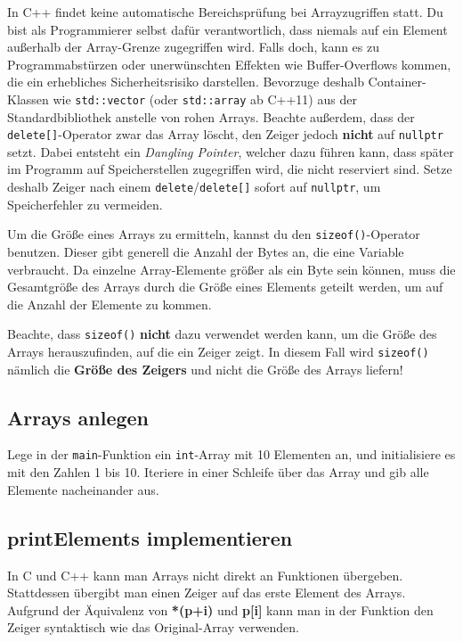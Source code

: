 In C++ findet keine automatische Bereichsprüfung bei Arrayzugriffen statt.
Du bist als Programmierer selbst dafür verantwortlich, dass niemals auf ein Element außerhalb der Array-Grenze zugegriffen wird.
Falls doch, kann es zu Programmabstürzen oder unerwünschten Effekten wie Buffer-Overflows kommen, die ein erhebliches Sicherheitsrisiko darstellen.
Bevorzuge deshalb Container-Klassen wie \lstinline{std::vector} (oder \lstinline{std::array} ab C++11) aus der Standardbibliothek anstelle von \glqq rohen\grqq{} Arrays.
Beachte außerdem, dass der \lstinline{delete[]}-Operator zwar das Array löscht, den Zeiger jedoch \textbf{nicht} auf \lstinline{nullptr} setzt.
Dabei entsteht ein \emph{Dangling Pointer}, welcher dazu führen kann, dass später im Programm auf Speicherstellen zugegriffen wird, die nicht reserviert sind.
Setze deshalb Zeiger nach einem \lstinline{delete}/\lstinline{delete[]} sofort auf \lstinline{nullptr}, um Speicherfehler zu vermeiden.

Um die Größe eines Arrays zu ermitteln, kannst du den \lstinline{sizeof()}-Operator benutzen.
Dieser gibt generell die Anzahl der Bytes an, die eine Variable verbraucht.
Da einzelne Array-Elemente größer als ein Byte sein können, muss die Gesamtgröße des Arrays durch die Größe eines Elements geteilt werden, um auf die Anzahl der Elemente zu kommen.


Beachte, dass \lstinline{sizeof()} \textbf{nicht} dazu verwendet werden kann, um die Größe des Arrays herauszufinden, auf die ein Zeiger zeigt.
In diesem Fall wird \lstinline{sizeof()} nämlich die \textbf{Größe des Zeigers} und nicht die Größe des Arrays liefern!


\subsection{Arrays anlegen}
Lege in der \lstinline{main}-Funktion ein \lstinline{int}-Array mit 10 Elementen an, und initialisiere es mit den Zahlen 1 bis 10.
Iteriere in einer Schleife über das Array und gib alle Elemente nacheinander aus.

\subsection{printElements implementieren}
In C und C++ kann man Arrays nicht direkt an Funktionen übergeben.
Stattdessen übergibt man einen Zeiger auf das erste Element des Arrays. Aufgrund der Äquivalenz von \textbf{*(p+i) } und \textbf{p[i]} kann man in der Funktion den Zeiger syntaktisch wie das Original-Array verwenden.

